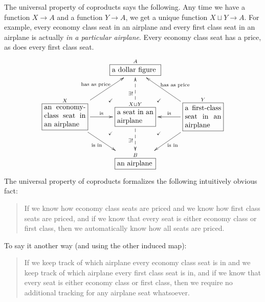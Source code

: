 \documentclass[a4paper]{book}
\def\tn{\textnormal}
\def\to{\rightarrow}
\newcommand{\LA}[2]{\ar[#1]^-{\tn {#2}}}
\newcommand{\LAL}[2]{\ar[#1]_-{\tn {#2}}}
\newcommand{\obox}[3]{\stackrel{#1}{\fbox{\parbox{#2}{#3}}}}
\theoremstyle{myth}
\newtheorem{exampleENG}[envENG]{\begin{english}Example\end{english}}
\begin{document}
\begin{russian}
\begin{exampleENG}
The universal property of coproducts says the following. Any time we have a function $X\to A$ and a function $Y\to A$, we get a unique function $X\sqcup Y\to A$. For example, every economy class seat in an airplane and every first class seat in an airplane is actually {\em in a particular airplane}. Every economy class seat has a price, as does every first class seat.
\begin{align}
\xymatrix{
&\obox{A}{.9in}{a dollar figure}&\\
\obox{X}{.8in}{an economy-class seat in an airplane}\LA{ru}{has as price}\LA{r}{is}\LAL{dr}{is in}&\obox{X\sqcup Y}{.7in}{a seat in an airplane}\ar@{-->}[d]_{\exists!}\ar@{-->}[u]^{\exists!}\ar@{}[ur]|(.35){\checkmark}\ar@{}[dl]|(.35){\checkmark}\ar@{}[dr]|(.35){\checkmark}\ar@{}[ul]|(.35){\checkmark}&\obox{Y}{.7in}{a first-class seat in an airplane}\LAL{l}{is}\LAL{lu}{has as price}\LA{dl}{is in}\\
&\obox{B}{.7in}{an airplane}&
}
\end{align}
The universal property of coproducts formalizes the following intuitively obvious fact:
\begin{quote}
If we know how economy class seats are priced and we know how first class seats are priced, and if we know that every seat is either economy class or first class, then we automatically know how all seats are priced.
\end{quote}
To say it another way (and using the other induced map):
\begin{quote}
If we keep track of which airplane every economy class seat is in and we keep track of which airplane every first class seat is in, and if we know that every seat is either economy class or first class, then we require no additional tracking for any airplane seat whatsoever.
\end{quote}
\end{exampleENG}


\end{russian}
\end{document}
